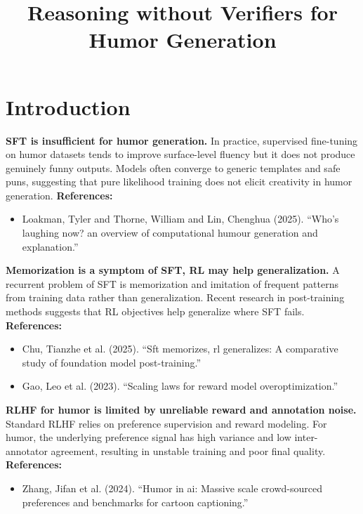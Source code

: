 \documentclass[12pt]{extarticle}
\title{Reasoning without Verifiers for Humor Generation}
\author{}
\date{}
\begin{document}
\maketitle

\section{Introduction}

\textbf{SFT is insufficient for humor generation.} In practice, supervised fine-tuning on humor datasets tends to improve surface-level fluency but it does not produce genuinely funny outputs. Models often converge to generic templates and safe puns, suggesting that pure likelihood training does not elicit creativity in humor generation.
\textbf{References:}
\begin{itemize}[leftmargin=1.5em]
  \item Loakman, Tyler and Thorne, William and Lin, Chenghua (2025). ``Who’s laughing now? an overview of computational humour generation and explanation.''
\end{itemize}

\textbf{Memorization is a symptom of SFT, RL may help generalization.} A recurrent problem of SFT is memorization and imitation of frequent patterns from training data rather than generalization. Recent research in post-training methods suggests that RL objectives help generalize where SFT fails.
\textbf{References:}
\begin{itemize}[leftmargin=1.5em]
  \item Chu, Tianzhe et al. (2025). ``Sft memorizes, rl generalizes: A comparative study of foundation model post-training.''
  \item Gao, Leo et al. (2023). ``Scaling laws for reward model overoptimization.''
\end{itemize}

\textbf{RLHF for humor is limited by unreliable reward and annotation noise.} Standard RLHF relies on preference supervision and reward modeling. For humor, the underlying preference signal has high variance and low inter-annotator agreement, resulting in unstable training and poor final quality.
\textbf{References:}
\begin{itemize}[leftmargin=1.5em]
  \item Zhang, Jifan et al. (2024). ``Humor in ai: Massive scale crowd-sourced preferences and benchmarks for cartoon captioning.''
\end{itemize}
\end{document}
